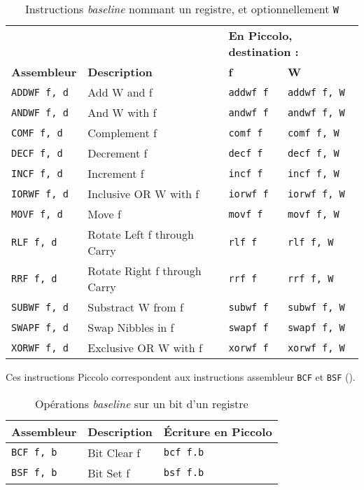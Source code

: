 \begin{table}[!ht]
  \centering
  \small
  \begin{tabular}{llll}
     &  & \multicolumn{2}{l}{\textbf{En Piccolo, destination :}} \\
    \textbf{Assembleur} & \textbf{Description} & \textbf{f} & \textbf{W}\\
    \hline
    \texttt{ADDWF f, d} & Add W and f & \texttt{addwf f}  & \texttt{addwf f, W} \\
    \texttt{ANDWF f, d} & And W with f & \texttt{andwf f} & \texttt{andwf f, W}\\
    \texttt{COMF f, d} & Complement f & \texttt{comf f} & \texttt{comf f, W}\\
    \texttt{DECF f, d} & Decrement f & \texttt{decf f} & \texttt{decf f, W}\\
    \texttt{INCF f, d} & Increment f & \texttt{incf f}& \texttt{incf f, W}\\
    \texttt{IORWF f, d} & Inclusive OR W with f & \texttt{iorwf f} & \texttt{iorwf f, W}\\
    \texttt{MOVF f, d} & Move f & \texttt{movf f} & \texttt{movf f, W}\\
    \texttt{RLF f, d} & Rotate Left f through Carry & \texttt{rlf f} & \texttt{rlf f, W}\\
    \texttt{RRF f, d} & Rotate Right f through Carry & \texttt{rrf f} & \texttt{rrf f, W}\\
    \texttt{SUBWF f, d} & Substract W from f & \texttt{subwf f} & \texttt{subwf f, W}\\
    \texttt{SWAPF f, d} & Swap Nibbles in f & \texttt{swapf f} & \texttt{swapf f, W}\\
    \texttt{XORWF f, d} & Exclusive OR W with f & \texttt{xorwf f} & \texttt{xorwf f, W}\\
  \hline
  \end{tabular}
  \caption{Instructions \emph{baseline} nommant un registre, et optionnellement \texttt{W}}
\end{table}



Ces instructions Piccolo correspondent aux instructions assembleur \texttt{BCF} et \texttt{BSF} ().

\begin{table}[!ht]
  \centering
  \small
  \begin{tabular}{lll}
    \textbf{Assembleur} & \textbf{Description} & \textbf{Écriture en Piccolo}\\
    \hline
    \texttt{BCF f, b} & Bit Clear f & \texttt{bcf f.b} \\
    \texttt{BSF f, b} & Bit Set f & \texttt{bsf f.b} \\
  \hline
  \end{tabular}
  \caption{Opérations \emph{baseline} sur un bit d'un registre}
\end{table}

